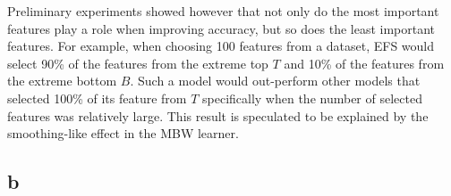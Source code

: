 \documentclass{article}
\begin{document}
Preliminary experiments showed however that not only do the most important features play a role when improving accuracy, but so does the least 
important features. For example, when choosing 100 features from a dataset, EFS would select 90\% of the features from the extreme top \(T\)
and 10\% of the features from the extreme bottom \(B\). Such a model would out-perform other models that selected 100\% of its feature from \(T\)
specifically when the number of selected features was relatively large. This result is speculated to be explained by the smoothing-like effect
in the MBW learner.

\subsection*{b}
\end{document}
